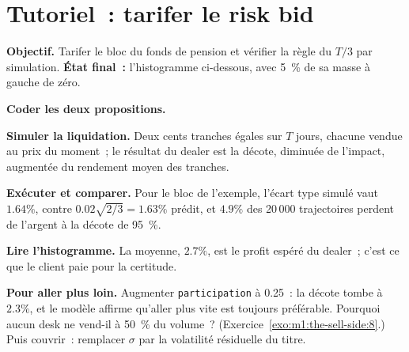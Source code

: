 \section{Tutoriel~: tarifer le risk bid}\label{tut:m1:the-sell-side:riskbid}

\begin{tutorial}
\textbf{Objectif.} Tarifer le bloc du fonds de pension et vérifier la règle du $T/3$ par
simulation. \textbf{État final~:} l'histogramme ci-dessous, avec 5~\% de sa masse
à gauche de zéro.
\begin{tutsteps}
\item \textbf{Coder les deux propositions.}
\label{lst:m1:the-sell-side:formulas}
\item \textbf{Simuler la liquidation.} Deux cents tranches égales sur $T$ jours,
chacune vendue au prix du moment~; le résultat du dealer est la décote, diminuée de
l'impact, augmentée du rendement moyen des tranches.
\label{lst:m1:the-sell-side:mc}
\item \textbf{Exécuter et comparer.} Pour le bloc de l'exemple, l'écart type simulé
vaut $1.64\%$, contre $0.02\sqrt{2/3} =
1.63\%$ prédit, et $4.9\%$ des 20\,000 trajectoires perdent de l'argent à la décote de 95~\%.
\item \textbf{Lire l'histogramme.} La moyenne, $2.7\%$, est le profit espéré du
dealer~; c'est ce que le client paie pour la certitude.
\end{tutsteps}
\textbf{Pour aller plus loin.} Augmenter \texttt{participation} à 0.25~: la décote tombe à
$2.3\%$, et le modèle affirme qu'aller plus vite est toujours préférable. Pourquoi aucun desk
ne vend-il à 50~\% du volume~? (Exercice~\ref{exo:m1:the-sell-side:8}.)
Puis couvrir~: remplacer $\sigma$ par la volatilité résiduelle du titre.
\end{tutorial}

\begin{omfigure}

\end{omfigure}

